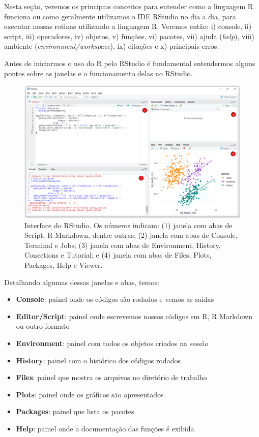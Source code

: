 \documentclass[
]{article}
\providecommand{\tightlist}{%
  \setlength{\itemsep}{0pt}\setlength{\parskip}{0pt}}
\begin{document}
Nesta seção, veremos os principais conceitos para entender como a linguagem R funciona ou como geralmente utilizamos o IDE RStudio no dia a dia, para executar nossas rotinas utilizando a linguagem R. Veremos então: i) console, ii) script, iii) operadores, iv) objetos, v) funções, vi) pacotes, vii) ajuda (\emph{help}), viii) ambiente (\emph{environment/workspace}), ix) citações e x) principais erros.

Antes de iniciarmos o uso do R pelo RStudio é fundamental entendermos alguns pontos sobre as janelas e o funcionamento delas no RStudio.

\begin{figure}

{\centering \includegraphics[width=0.75\linewidth,height=0.75\textheight]{figures/cap04_fig02} 

}

\caption{Interface do RStudio. Os números indicam: (1) janela com abas de Script, R Markdown, dentre outras; (2) janela com abas de Console, Terminal e Jobs; (3) janela com abas de Environment, History, Conections e Tutorial; e (4) janela com abas de Files, Plots, Packages, Help e Viewer.}\label{fig:fig-rstudio}
\end{figure}

Detalhando algumas dessas janelas e abas, temos:

\begin{itemize}
\tightlist
\item
  \textbf{Console}: painel onde os códigos são rodados e vemos as saídas
\item
  \textbf{Editor/Script}: painel onde escrevemos nossos códigos em R, R Markdown ou outro formato
\item
  \textbf{Environment}: painel com todos os objetos criados na sessão
\item
  \textbf{History}: painel com o histórico dos códigos rodados
\item
  \textbf{Files}: painel que mostra os arquivos no diretório de trabalho
\item
  \textbf{Plots}: painel onde os gráficos são apresentados
\item
  \textbf{Packages}: painel que lista os pacotes
\item
  \textbf{Help}: painel onde a documentação das funções é exibida
\end{itemize}
\end{document}
